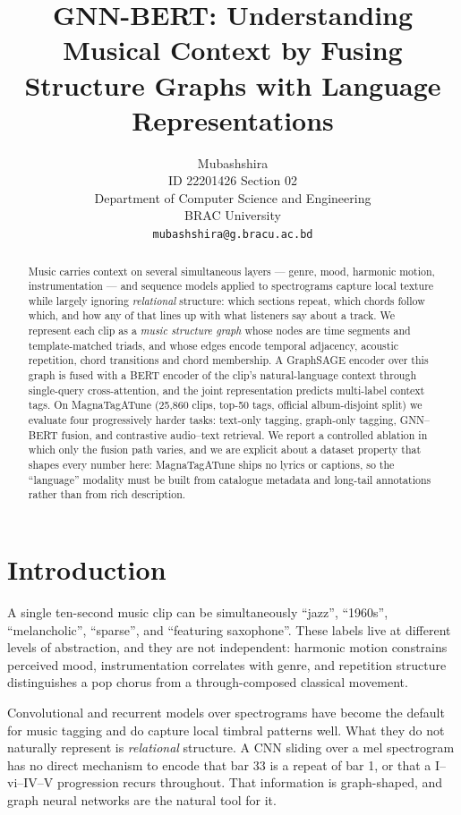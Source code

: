 \documentclass{article}
\title{GNN-BERT: Understanding Musical Context by Fusing\\Structure Graphs with Language Representations}
\author{%
  Mubashshira \\
  ID 22201426 \quad Section 02 \\
  Department of Computer Science and Engineering \\
  BRAC University \\
  \texttt{mubashshira@g.bracu.ac.bd}
}
\begin{document}
\maketitle

\begin{abstract}
Music carries context on several simultaneous layers --- genre, mood, harmonic
motion, instrumentation --- and sequence models applied to spectrograms capture
local texture while largely ignoring \emph{relational} structure: which sections
repeat, which chords follow which, and how any of that lines up with what
listeners say about a track. We represent each clip as a \emph{music structure
graph} whose nodes are time segments and template-matched triads, and whose edges
encode temporal adjacency, acoustic repetition, chord transitions and chord
membership. A GraphSAGE encoder over this graph is fused with a BERT encoder of
the clip's natural-language context through single-query cross-attention, and the
joint representation predicts multi-label context tags. On MagnaTagATune
(25{,}860 clips, top-50 tags, official album-disjoint split) we evaluate four
progressively harder tasks: text-only tagging, graph-only tagging, GNN--BERT
fusion, and contrastive audio--text retrieval. We report a controlled ablation in
which only the fusion path varies, and we are explicit about a dataset property
that shapes every number here: MagnaTagATune ships no lyrics or captions, so the
``language'' modality must be built from catalogue metadata and long-tail
annotations rather than from rich description.
\end{abstract}

\section{Introduction}
\label{sec:intro}

A single ten-second music clip can be simultaneously ``jazz'', ``1960s'',
``melancholic'', ``sparse'', and ``featuring saxophone''. These labels live at
different levels of abstraction, and they are not independent: harmonic motion
constrains perceived mood, instrumentation correlates with genre, and repetition
structure distinguishes a pop chorus from a through-composed classical movement.

Convolutional and recurrent models over spectrograms have become the default for
music tagging and do capture local timbral patterns well. What they do not
naturally represent is \emph{relational} structure. A CNN sliding over a mel
spectrogram has no direct mechanism to encode that bar 33 is a repeat of bar 1,
or that a I--vi--IV--V progression recurs throughout. That information is
graph-shaped, and graph neural networks are the natural tool for it.
\end{document}
